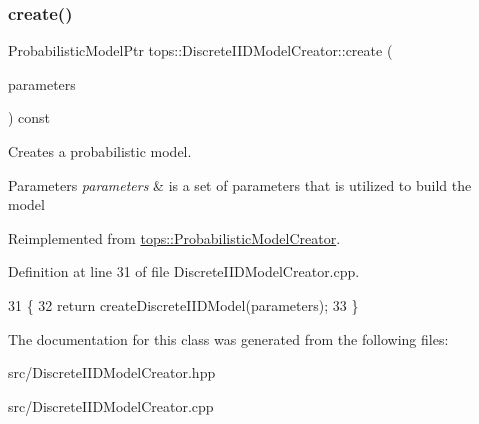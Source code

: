 \subsubsection{\texorpdfstring{create()}{create()}}
{\footnotesize\ttfamily Probabilistic\+Model\+Ptr tops\+::\+Discrete\+I\+I\+D\+Model\+Creator\+::create (\begin{DoxyParamCaption}\item[{\hyperlink{classtops_1_1ProbabilisticModelParameters}{Probabilistic\+Model\+Parameters} \&}]{parameters }\end{DoxyParamCaption}) const\hspace{0.3cm}{\ttfamily [virtual]}}



Creates a probabilistic model. 


\begin{DoxyParams}{Parameters}
{\em parameters} & is a set of parameters that is utilized to build the model \\
\hline
\end{DoxyParams}


Reimplemented from \hyperlink{classtops_1_1ProbabilisticModelCreator_afed6c8ffa45fff446bdaa8b533da8f7c}{tops\+::\+Probabilistic\+Model\+Creator}.



Definition at line 31 of file Discrete\+I\+I\+D\+Model\+Creator.\+cpp.


\begin{DoxyCode}
31                                                                                                        \{
32     \textcolor{keywordflow}{return} createDiscreteIIDModel(parameters);
33   \}
\end{DoxyCode}


The documentation for this class was generated from the following files\+:\begin{DoxyCompactItemize}
\item 
src/Discrete\+I\+I\+D\+Model\+Creator.\+hpp\item 
src/Discrete\+I\+I\+D\+Model\+Creator.\+cpp\end{DoxyCompactItemize}
